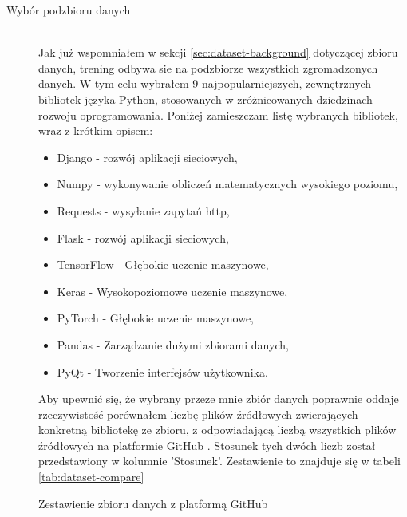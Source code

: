 \begin{description}
\item[Wybór podzbioru danych]
\hfill \\ 
Jak już wspomniałem w sekcji \ref{sec:dataset-background} dotyczącej zbioru danych, trening odbywa sie na podzbiorze wszystkich zgromadzonych danych. W tym celu wybrałem 9 najpopularniejszych, 
zewnętrznych bibliotek języka Python, stosowanych w zróżnicowanych dziedzinach rozwoju oprogramowania. Poniżej zamieszczam listę wybranych bibliotek, wraz z krótkim opisem:
\begin{itemize}
    \item Django - rozwój aplikacji sieciowych,
    \item Numpy - wykonywanie obliczeń matematycznych wysokiego poziomu,
    \item Requests - wysyłanie zapytań http, 
    \item Flask - rozwój aplikacji sieciowych,
    \item TensorFlow - Głębokie uczenie maszynowe,
    \item Keras - Wysokopoziomowe uczenie maszynowe,
    \item PyTorch - Głębokie uczenie maszynowe, 
    \item Pandas - Zarządzanie dużymi zbiorami danych, 
    \item PyQt - Tworzenie interfejsów użytkownika.
\end{itemize} 
Aby upewnić się, że wybrany przeze mnie zbiór danych poprawnie oddaje rzeczywistość porównałem liczbę plików źródłowych zwierających konkretną bibliotekę ze zbioru, z odpowiadającą 
liczbą wszystkich plików źródłowych na platformie GitHub \cite{github}. Stosunek tych dwóch liczb został przedstawiony w kolumnie 'Stosunek'. Zestawienie to znajduje się w tabeli \ref{tab:dataset-compare} 
\begin{table}[!h] \centering
    \caption{Zestawienie zbioru danych z platformą GitHub}
    \label{tab:dataset-compare}
    

\end{table}
\end{description}
